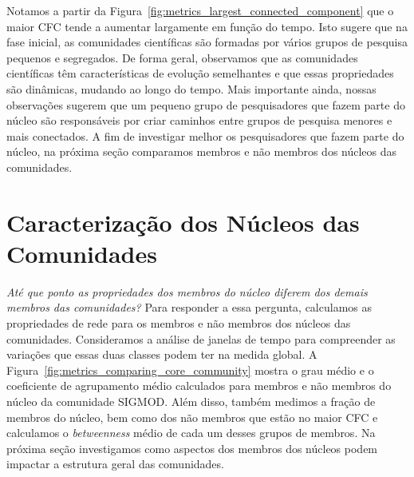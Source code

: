 \documentclass[12pt]{article}
\begin{document}
Notamos a partir da Figura~\ref{fig:metrics_largest_connected_component} que o maior CFC tende a aumentar largamente em função do 
tempo. Isto sugere que na fase inicial, as comunidades científicas são formadas por vários grupos de pesquisa pequenos 
e segregados. De forma geral, observamos que as comunidades científicas têm características de evolução semelhantes e que essas 
propriedades são dinâmicas, mudando ao longo do tempo. Mais importante ainda, nossas observações sugerem que 
um pequeno grupo de pesquisadores que fazem parte do núcleo são responsáveis por criar caminhos entre grupos de 
pesquisa menores e mais conectados. A fim de investigar melhor os pesquisadores que fazem parte do núcleo, 
na próxima seção comparamos membros e não membros dos núcleos das comunidades.

\section{Caracterização dos Núcleos das Comunidades}

\textit{Até que ponto as propriedades dos membros do núcleo diferem dos demais membros das comunidades?} Para responder a essa 
pergunta, calculamos as propriedades de rede para os membros e não membros dos núcleos das comunidades. Consideramos 
a análise de janelas de tempo para compreender as variações que essas duas classes podem ter na medida global. 
A Figura~\ref{fig:metrics_comparing_core_community} mostra o grau médio e o coeficiente de agrupamento médio calculados para 
membros e não membros do núcleo da comunidade SIGMOD. Além disso, 
também medimos a fração de membros do núcleo, bem como dos não membros que estão no maior CFC e calculamos 
o \textit{betweenness} médio de cada um desses grupos de membros. Na próxima 
seção investigamos como aspectos dos membros dos núcleos podem impactar a estrutura geral das comunidades.
\end{document}
